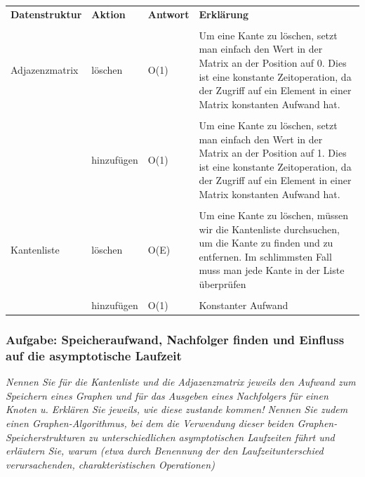 \documentclass{article}
\begin{document}
\begin{table}[H]
    \centering
    \begin{tabular}{p{2.5cm} | p{1.5cm} p{1.5cm} p{8cm}}
        \textbf{Datenstruktur} &\textbf{Aktion} & \textbf{Antwort} & \textbf{Erklärung} \\ \\ \hline  
        Adjazenzmatrix \index{Adjazenzmatrix} & löschen & O(1) & Um eine Kante zu löschen, setzt man einfach den Wert in der Matrix an der Position auf 0. Dies ist eine konstante Zeitoperation, da der Zugriff auf ein Element in einer Matrix konstanten Aufwand hat.\\ \\   
        & hinzufügen & O(1) & Um eine Kante zu löschen, setzt man einfach den Wert in der Matrix an der Position auf 1. Dies ist eine konstante Zeitoperation, da der Zugriff auf ein Element in einer Matrix konstanten Aufwand hat.\\ \\
        Kantenliste \index{Kantenliste} & löschen & O(E) & Um eine Kante zu löschen, müssen wir die Kantenliste durchsuchen, um die Kante zu finden und zu entfernen. Im schlimmsten Fall muss man jede Kante in der Liste überprüfen \\ \\
        & hinzufügen &  O(1) & Konstanter Aufwand \\
    \end{tabular}
    \label{tab:Löschen und Einfügen}
\end{table}

\newpage
\subsubsection{Aufgabe: Speicheraufwand, Nachfolger finden und Einfluss auf die asymptotische Laufzeit \textcolor{ForestGreen}{\CheckmarkBold}}
\textit{Nennen Sie für die Kantenliste und die Adjazenzmatrix jeweils den Aufwand zum Speichern eines Graphen und für das Ausgeben eines Nachfolgers für einen Knoten u. Erklären Sie jeweils, wie diese zustande kommen! \newline
Nennen Sie zudem einen Graphen-Algorithmus, bei dem die Verwendung dieser beiden Graphen-Speicherstrukturen zu unterschiedlichen asymptotischen Laufzeiten  führt und erläutern Sie, warum (etwa durch Benennung der den Laufzeitunterschied verursachenden, charakteristischen Operationen) }\cite{hauptklausur21} \newline
\end{document}
